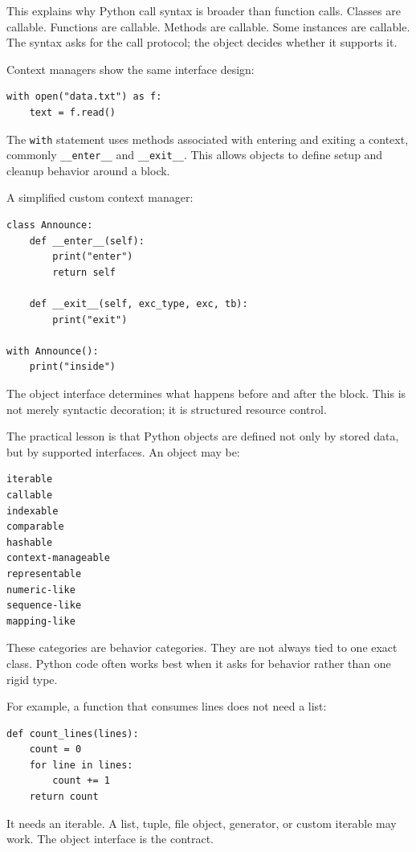 This explains why Python call syntax is broader than function calls. Classes are callable. Functions are callable. Methods are callable. Some instances are callable. The syntax asks for the call protocol; the object decides whether it supports it.

Context managers show the same interface design:

\begin{verbatim}
with open("data.txt") as f:
    text = f.read()
\end{verbatim}

The \texttt{with} statement uses methods associated with entering and exiting a context, commonly \texttt{\_\_enter\_\_} and \texttt{\_\_exit\_\_}. This allows objects to define setup and cleanup behavior around a block.

A simplified custom context manager:

\begin{verbatim}
class Announce:
    def __enter__(self):
        print("enter")
        return self

    def __exit__(self, exc_type, exc, tb):
        print("exit")

with Announce():
    print("inside")
\end{verbatim}

The object interface determines what happens before and after the block. This is not merely syntactic decoration; it is structured resource control.

The practical lesson is that Python objects are defined not only by stored data, but by supported interfaces. An object may be:

\begin{verbatim}
iterable
callable
indexable
comparable
hashable
context-manageable
representable
numeric-like
sequence-like
mapping-like
\end{verbatim}

These categories are behavior categories. They are not always tied to one exact class. Python code often works best when it asks for behavior rather than one rigid type.

For example, a function that consumes lines does not need a list:

\begin{verbatim}
def count_lines(lines):
    count = 0
    for line in lines:
        count += 1
    return count
\end{verbatim}

It needs an iterable. A list, tuple, file object, generator, or custom iterable may work. The object interface is the contract.

